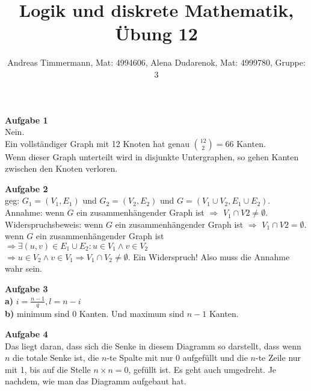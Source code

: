 \documentclass[a4paper]{scrartcl}
\title{Logik und diskrete Mathematik, Übung 12}
\author{Andreas Timmermann, Mat: 4994606, Alena Dudarenok, Mat: 4999780, Gruppe: 3}
\begin{document}
	\maketitle
	\begin{flushleft}
		\textbf{Aufgabe 1}\\
		Nein.\\
		Ein vollständiger Graph mit 12 Knoten hat genau $\binom{12}{2}=66$ Kanten.\\
		Wenn dieser Graph unterteilt wird in disjunkte Untergraphen, so gehen Kanten zwischen den Knoten verloren.\\
	\end{flushleft}
	\begin{flushleft}
		\textbf{Aufgabe 2}\\
		geg: $G_1=(V_1,E_1)$ und $G_2=(V_2,E_2)$ und $G=(V_1\cup V_2,E_1\cup E_2)$.\\
		Annahme: wenn $G$ ein zusammenhängender Graph ist $\Rightarrow$ $V_1\cap V2\neq \emptyset$.\\[1em]
		 Widerspruchsbeweis: wenn $G$ ein zusammenhängender Graph ist $\Rightarrow$ $V_1\cap V2=\emptyset$.\\
		 wenn $G$ ein zusammenhängender Graph ist $\Rightarrow \exists (u,v)\in E_1\cup E_2: u\in V_1 \wedge v\in V_2$\\
		 $\Rightarrow u\in V_2 \wedge v\in V_1 \Rightarrow V_1\cap V_2\neq \emptyset$. Ein Widerspruch! Also muss die Annahme wahr sein.\\[1em]
	\end{flushleft}
	\begin{flushleft}
		\textbf{Aufgabe 3}\\
		\textbf{a)} $i = \frac{n-1}{q}, l = n-i$\\
		\textbf{b)} minimum sind 0 Kanten. Und maximum sind $n-1$ Kanten.\\[1em]
	\end{flushleft}
	\begin{flushleft}
		\textbf{Aufgabe 4}\\
		Das liegt daran, dass sich die Senke in diesem Diagramm so darstellt, dass wenn $n$ die totale Senke ist, die $n$-te Spalte mit nur 0 aufgefüllt und die $n$-te Zeile nur mit 1, bis auf die Stelle $n\times n = 0$, gefüllt ist. Es geht auch umgedreht. Je nachdem, wie man das Diagramm aufgebaut hat.
	\end{flushleft}
\end{document}
